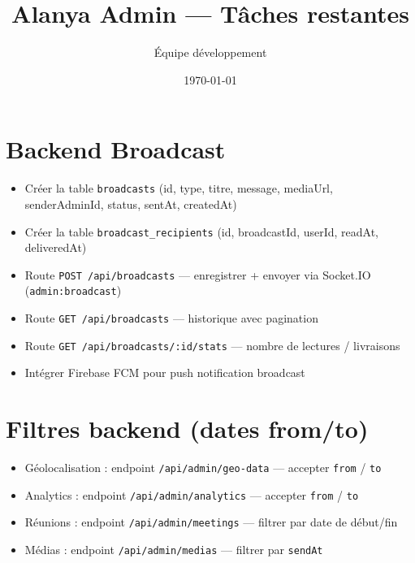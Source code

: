 \documentclass{article}
\title{Alanya Admin --- Tâches restantes}
\author{Équipe développement}
\date{\today}
\begin{document}
\maketitle

\section{Backend Broadcast}
\label{sec:broadcast}

\begin{itemize}[leftmargin=*, labelsep=0.5em]
  \item[\textbullet] Créer la table \texttt{broadcasts} (id, type, titre, message, mediaUrl, senderAdminId, status, sentAt, createdAt)
  \item[\textbullet] Créer la table \texttt{broadcast\_recipients} (id, broadcastId, userId, readAt, deliveredAt)
  \item[\textbullet] Route \texttt{POST /api/broadcasts} --- enregistrer + envoyer via Socket.IO (\texttt{admin:broadcast})
  \item[\textbullet] Route \texttt{GET /api/broadcasts} --- historique avec pagination
  \item[\textbullet] Route \texttt{GET /api/broadcasts/:id/stats} --- nombre de lectures / livraisons
  \item[\textbullet] Intégrer Firebase FCM pour push notification broadcast
\end{itemize}

\section{Filtres backend (dates from/to)}
\label{sec:filters}

\begin{itemize}[leftmargin=*, labelsep=0.5em]
  \item[\textbullet] Géolocalisation : endpoint \texttt{/api/admin/geo-data} --- accepter \texttt{from} / \texttt{to}
  \item[\textbullet] Analytics : endpoint \texttt{/api/admin/analytics} --- accepter \texttt{from} / \texttt{to}
  \item[\textbullet] Réunions : endpoint \texttt{/api/admin/meetings} --- filtrer par date de début/fin
  \item[\textbullet] Médias : endpoint \texttt{/api/admin/medias} --- filtrer par \texttt{sendAt}
\end{itemize}
\end{document}
